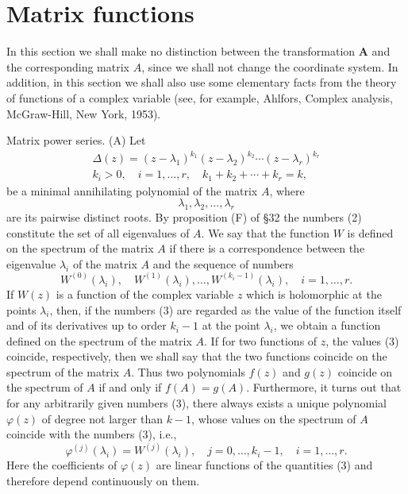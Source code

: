 \documentclass[10pt,a5paper]{book}
\theoremstyle{plain}
\theoremstyle{definition}
\theoremstyle{remark}
\begin{document}
\section{Matrix functions}
In this section we shall make no distinction between the transformation $\mathbf{A}$ and the corresponding matrix $A$, since we shall not change the coordinate system. In addition, in this section we shall also use some elementary facts from the theory of functions of a complex variable (see, for example, Ahlfors, Complex analysis, McGraw-Hill, New York, 1953).

Matrix power series. (A) Let
\begin{gather*}
\Delta(z)=\left(z-\lambda_{1}\right)^{k_{1}}\left(z-\lambda_{2}\right)^{k_{2}} \cdots\left(z-\lambda_{r}\right)^{k_{r}} \\
k_{i}>0, \quad i=1, \ldots, r, \quad k_{1}+k_{2}+\cdots+k_{r}=k, \tag{1}
\end{gather*}
be a minimal annihilating polynomial of the matrix $A$, where
\begin{equation*}
\lambda_{1}, \lambda_{2}, \ldots, \lambda_{r} \tag{2}
\end{equation*}
are its pairwise distinct roots. By proposition (F) of §32 the numbers (2) constitute the set of all eigenvalues of $A$. We say that the function $W$ is defined on the spectrum of the matrix $A$ if there is a correspondence between the eigenvalue $\lambda_{i}$ of the matrix $A$ and the sequence of numbers
\begin{equation*}
W^{(0)}\left(\lambda_{i}\right), \quad W^{(1)}\left(\lambda_{i}\right), \ldots, W^{\left(k_{i}-1\right)}\left(\lambda_{i}\right), \quad i=1, \ldots, r . \tag{3}
\end{equation*}
If $W(z)$ is a function of the complex variable $z$ which is holomorphic at the points $\lambda_{i}$, then, if the numbers (3) are regarded as the value of the function itself and of its derivatives up to order $k_{i}-1$ at the point $\lambda_{i}$, we obtain a function defined on the spectrum of the matrix $A$. If for two functions of $z$, the values (3) coincide, respectively, then we shall say that the two
functions coincide on the spectrum of the matrix $A$. Thus two polynomials $f(z)$ and $g(z)$ coincide on the spectrum of $A$ if and only if $f(A)=g(A)$. Furthermore, it turns out that for any arbitrarily given numbers (3), there always exists a unique polynomial $\varphi(z)$ of degree not larger than $k-1$, whose values on the spectrum of $A$ coincide with the numbers (3), i.e.,
\begin{equation*}
\varphi^{(j)}\left(\lambda_{i}\right)=W^{(j)}\left(\lambda_{i}\right), \quad j=0, \ldots, k_{i}-1, \quad i=1, \ldots, r . \tag{4}
\end{equation*}
Here the coefficients of $\varphi(z)$ are linear functions of the quantities (3) and therefore depend continuously on them.
\end{document}
